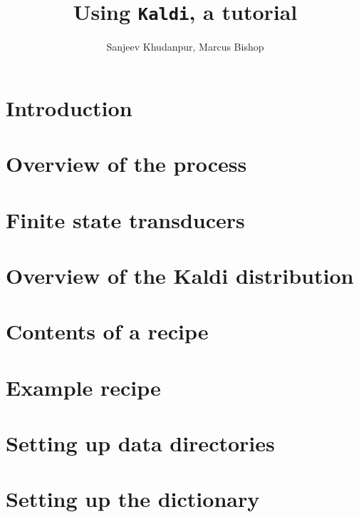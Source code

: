\documentclass[12pt]{article}
\title{Using \texttt{Kaldi}, a tutorial}
\author{Sanjeev Khudanpur, Marcus Bishop}
\begin{document}
\maketitle

\section{Introduction}

\section{Overview of the process}

\section{Finite state transducers}

\section{Overview of the \textsf{Kaldi} distribution}

\section{Contents of a recipe}

\section{Example recipe}


\section{Setting up data directories}

\section{Setting up the dictionary}

\end{document}

